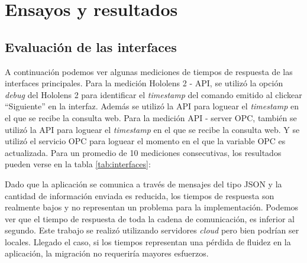 
\chapter{Ensayos y resultados} %

\label{Chapter4} %


\section{Evaluación de las interfaces}
\label{sec:pruebasHW}

A continuación podemos ver algunas mediciones de tiempos de respuesta de las interfaces principales. Para la medición Hololens 2 - API, se utilizó la opción \textit{debug} del Hololens 2 para identificar el \textit{timestamp} del comando emitido al clickear ``Siguiente'' en la interfaz. Además se utilizó la API para loguear el \textit{timestamp} en el que se recibe la consulta web. Para la medición API - server OPC, también se utilizó la API para loguear el \textit{timestamp} en el que se recibe la consulta web. Y se utilizó el servicio OPC para loguear el momento en el que la variable OPC es actualizada. Para un promedio de 10 mediciones consecutivas, los resultados pueden verse en la tabla \ref{tab:interfaces}:

\begin{table}[htpb]
	\centering
	\caption[Tiempos de respuesta]{Tiempos de respuesta promedio}
	\label{tab:interfaces}
\end{table}

Dado que la aplicación se comunica a través de mensajes del tipo JSON y la cantidad de información enviada es reducida, los tiempos de respuesta son realmente bajos y no representan un problema para la implementación. Podemos ver que el tiempo de respuesta de toda la cadena de comunicación, es inferior al segundo. Este trabajo se realizó utilizando servidores \textit{cloud} pero bien podrían ser locales. Llegado el caso, si los tiempos representan una pérdida de fluidez en la aplicación, la migración no requeriría mayores esfuerzos. 
